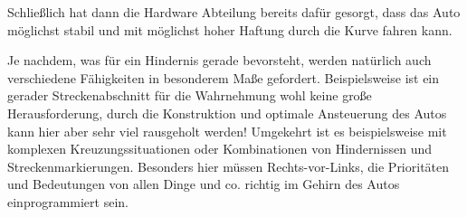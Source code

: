 Schließlich hat dann die Hardware Abteilung bereits dafür gesorgt, dass das Auto möglichst stabil und mit möglichst hoher Haftung 
durch die Kurve fahren kann.

Je nachdem, was für ein Hindernis gerade bevorsteht, werden natürlich auch verschiedene Fähigkeiten in besonderem
Maße gefordert. Beispielsweise ist ein gerader Streckenabschnitt für die Wahrnehmung wohl keine große Herausforderung, durch die Konstruktion 
und optimale Ansteuerung des Autos kann hier aber sehr viel rausgeholt werden!
Umgekehrt ist es beispielsweise mit komplexen Kreuzungssituationen oder Kombinationen von Hindernissen und Streckenmarkierungen.
Besonders hier müssen Rechts-vor-Links, die Prioritäten und Bedeutungen von allen Dinge und co. richtig im Gehirn des Autos einprogrammiert sein.
